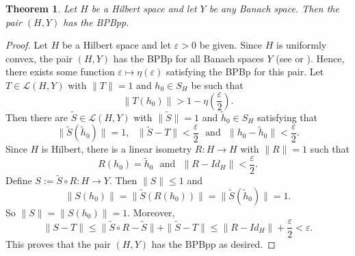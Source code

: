 \documentclass[12pt,a4paper]{amsart}
\newtheorem{theorem}{Theorem}[section]
\theoremstyle{definition}
\newcommand{\e}{\varepsilon}
\numberwithin{equation}{section}
\begin{document}
\begin{theorem} Let $H$ be a Hilbert space and let $Y$ be any Banach space. Then the pair $(H, Y)$ has the BPBpp.
\label{DKL4}
\end{theorem}

\begin{proof} Let $H$ be a Hilbert space and let $\e > 0$ be given. Since $H$ is uniformly convex, the pair $(H, Y)$ has the BPBp for all Banach spaces $Y$ (see \cite[Theorem 3.1]{KL} or \cite[Corollary 2.3]{ABGM}). Hence, there exists some function $\e \longmapsto \eta(\e)$ satisfying the BPBp for this pair. Let $T \in \mathcal{L}(H, Y)$ with $\|T\| = 1$ and $h_0 \in S_H$ be such that
\begin{equation*}
\|T(h_0)\| > 1 - \eta\left( \frac{\e}{2} \right).
\end{equation*}
Then there are  $\widetilde{S} \in \mathcal{L}(H, Y)$ with $\|\widetilde{S}\| = 1$ and $\widetilde{h}_0 \in S_H$ satisfying that
\begin{equation*}
\|\widetilde{S}(\widetilde{h}_0)\| = 1, \ \ \ \|\widetilde{S} - T\| < \frac{\e}{2} \ \ \ \mbox{and} \ \ \ \|h_0 - \widetilde{h}_0\| < \frac{\e}{2}.
\end{equation*}
Since $H$ is Hilbert, there is a linear isometry $R: H \longrightarrow H$ with $\|R\| = 1$ such that
\begin{equation*}
R(h_0) = \widetilde{h}_0 \ \ \ \mbox{and} \ \ \ \|R - Id_H\| < \frac{\e}{2}.
\end{equation*}
Define $S := \widetilde{S} \circ R: H \longrightarrow Y$. Then $\|S\| \leq 1$ and
\begin{equation*}
\|S(h_0)\| = \| \widetilde{S}(R(h_0))\| = \| \widetilde{S} (\widetilde{h}_0)\| = 1.
\end{equation*}
So $\|S\| = \|S(h_0)\| = 1$. Moreover,
\begin{equation*}
\|S - T\| \leq \| \widetilde{S} \circ R - \widetilde{S}\| + \| \widetilde{S} - T\| \leq \| R - Id_H\| + \frac{\e}{2} < \e.
\end{equation*}
This proves that the pair $(H, Y)$ has the BPBpp as desired.
\end{proof}

\end{document}
